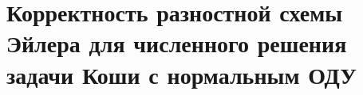 \documentclass[__main__.tex]{subfiles}
\begin{document}
\section{Корректность разностной схемы Эйлера для численного решения задачи Коши с нормальным ОДУ}
\end{document}
